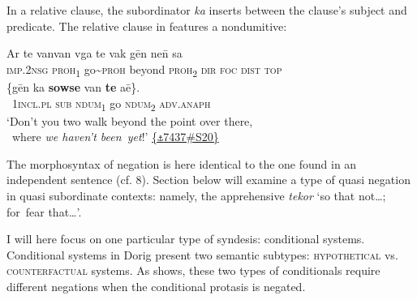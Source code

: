 \documentclass[output=paper,colorlinks,citecolor=brown,draft]{langscibook}
\begin{document}
In a relative clause, the subordinator \textit{ka} inserts between the clause’s subject and predicate. The relative clause in  features a nondumitive:

\ea\label{ex:dor:point} 
    \gll  Ar te vanvan vga te vak gēn ne\={n} sa  \\
          \textsc{imp.2nsg} \textsc{proh\textsubscript{1}} go{\textasciitilde}\textsc{proh} beyond \textsc{proh\textsubscript{2}} \textsc{dir} \textsc{foc} \textsc{dist} \textsc{top} \\
          
    \gll  \{gēn ka \textbf{sowse} van \textbf{te} aē\}.  \\
          ~\textsc{1incl.pl} \textsc{sub} \textsc{ndum\textsubscript{1}} go \textsc{ndum\textsubscript{2}} \textsc{adv.anaph} \\
    \glt ‘Don’t you two walk beyond the point over there, \\~where \textit{we haven’t been~yet}!’ \quad  \href{https://doi.org/10.24397/pangloss-0007437#S20}{\{\texttt{⚓}7437\#S20\}} 
\z 


The morphosyntax of negation is here identical to the one found in an independent sentence (cf. 8). Section  below will examine a type of quasi negation in quasi subordinate contexts: namely, the apprehensive \textit{tekor} ‘so that not…; for~fear that…’.

I will here focus on one particular type of syndesis: conditional systems. Conditional systems in Dorig present two semantic subtypes: \textsc{hypothetical} vs. \textsc{counterfactual} systems. As  shows, these two types of conditionals require different negations when the conditional protasis is negated.
\end{document}
